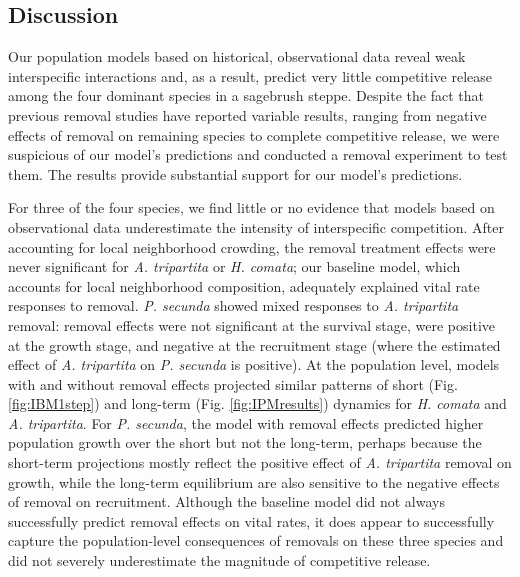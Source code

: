 \documentclass[11pt]{article}
\begin{document}
\begin{doublespacing}
\section*{Discussion}

Our population models based on historical, observational data reveal weak interspecific interactions \citep{adler_coexistence_2010,chu_large_2015} and, as a result, predict very little competitive release among the four dominant species in a sagebrush steppe. Despite the fact that previous removal studies have reported variable results, ranging from negative effects of removal on remaining species to complete competitive release, we were suspicious of our model's predictions and conducted a removal experiment to test them. The results provide substantial support for our model's predictions.

For three of the four species, we find little or no evidence that models based on observational data underestimate the intensity of interspecific competition. After accounting for local neighborhood crowding, the removal treatment effects were never significant for \textit{A. tripartita} or \textit{H. comata}; our baseline model, which accounts for local neighborhood composition, adequately explained vital rate responses to  removal.  \textit{P. secunda} showed mixed responses to \textit{A. tripartita} removal: removal effects were not significant at the survival stage, were positive at the growth stage, and negative at the recruitment stage (where the estimated effect of \textit{A. tripartita} on \textit{P. secunda} is positive). At the population level, models with and without removal effects projected similar patterns of short (Fig. \ref{fig:IBM1step}) and long-term (Fig. \ref{fig:IPMresults}) dynamics for \textit{H. comata} and \textit{A. tripartita}. For \textit{P. secunda}, the model with removal effects predicted higher population growth over the short but not the long-term, perhaps because the short-term projections mostly reflect the positive effect of \textit{A. tripartita} removal on growth, while the long-term equilibrium are also sensitive to the negative effects of removal on recruitment. Although the baseline model did not always successfully predict removal effects on vital rates, it does appear to successfully capture the population-level consequences of removals on these three species and did not severely underestimate the magnitude of competitive release.


\end{doublespacing}
\end{document}
